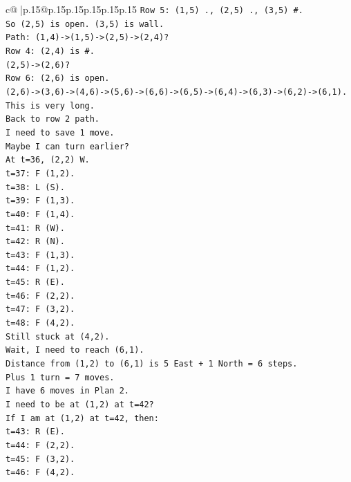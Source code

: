 \documentclass{article}
\begin{document}
{\begin{supertabular}{c@{$\;$}|p{.15\linewidth}@{}p{.15\linewidth}p{.15\linewidth}p{.15\linewidth}p{.15\linewidth}p{.15\linewidth}}
{{{\texttt{Row 5: (1,5) ., (2,5) ., (3,5) \#.} \\
\texttt{So (2,5) is open. (3,5) is wall.} \\
\texttt{Path: (1,4){-}>(1,5){-}>(2,5){-}>(2,4)?} \\
\texttt{Row 4: (2,4) is \#.} \\
\texttt{(2,5){-}>(2,6)?} \\
\texttt{Row 6: (2,6) is open.} \\
\texttt{(2,6){-}>(3,6){-}>(4,6){-}>(5,6){-}>(6,6){-}>(6,5){-}>(6,4){-}>(6,3){-}>(6,2){-}>(6,1).} \\
\texttt{This is very long.} \\
\texttt{Back to row 2 path.} \\
\texttt{I need to save 1 move.} \\
\texttt{Maybe I can turn earlier?} \\
\texttt{At t=36, (2,2) W.} \\
\texttt{t=37: F (1,2).} \\
\texttt{t=38: L (S).} \\
\texttt{t=39: F (1,3).} \\
\texttt{t=40: F (1,4).} \\
\texttt{t=41: R (W).} \\
\texttt{t=42: R (N).} \\
\texttt{t=43: F (1,3).} \\
\texttt{t=44: F (1,2).} \\
\texttt{t=45: R (E).} \\
\texttt{t=46: F (2,2).} \\
\texttt{t=47: F (3,2).} \\
\texttt{t=48: F (4,2).} \\
\texttt{Still stuck at (4,2).} \\
\texttt{Wait, I need to reach (6,1).} \\
\texttt{Distance from (1,2) to (6,1) is 5 East + 1 North = 6 steps.} \\
\texttt{Plus 1 turn = 7 moves.} \\
\texttt{I have 6 moves in Plan 2.} \\
\texttt{I need to be at (1,2) at t=42?} \\
\texttt{If I am at (1,2) at t=42, then:} \\
\texttt{t=43: R (E).} \\
\texttt{t=44: F (2,2).} \\
\texttt{t=45: F (3,2).} \\
\texttt{t=46: F (4,2).} \\
}}}
\end{supertabular}}
\end{document}
